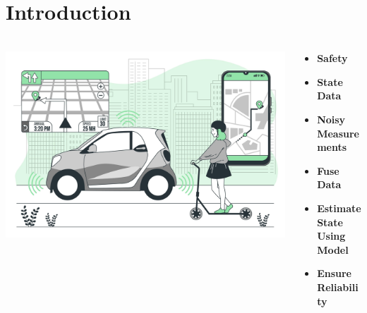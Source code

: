 \documentclass[handout, aspectratio=169]{beamer}
\begin{document}
\section{Introduction}
\begin{frame}
    \frametitle{}
    \begin{columns}[T]

        \begin{column}{0.5\textwidth}            
            \includegraphics[width=\textwidth]{figs/car environment}   
        \end{column}

        \begin{column}{0.5\textwidth}

        \begin{tcolorbox}[colbacktitle=title1, title=\textbf{The Problem: AV Safety Imperative}]
                \begin{itemize}
                    \item<1-> \textbf{Safety} \pause
                    \item<2-> \textbf{State Data} \pause
                    \item<3-> \textbf{Noisy Measurements}
                \end{itemize}
            \end{tcolorbox}
            
            \begin{tcolorbox}[colbacktitle=title1, title=\textbf{The Solution: State Estimation}]
                \begin{itemize}
                    \item<4-> \textbf{Fuse Data} \pause
                    \item<5-> \textbf{Estimate State Using Model} \pause
                    \item<6-> \textbf{Ensure Reliability}
                \end{itemize}
            \end{tcolorbox}
        \end{column}

    \end{columns}
\end{frame}
\end{document}
